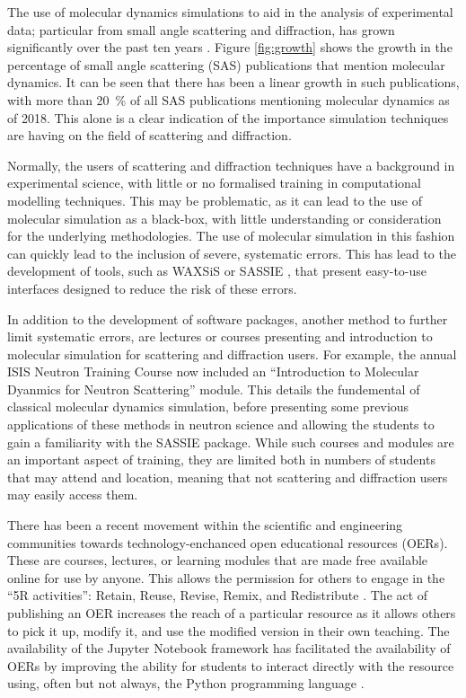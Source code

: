 \documentclass[pdf]{iucr}              %
\begin{document}
The use of molecular dynamics simulations to aid in the analysis of experimental data; particular from small angle scattering and diffraction, has grown significantly over the past ten years \cite{Pan2012,Boldon2015,Hub2018,Ivanovic2018,East2016,Wall2014,Wall2018,Satoh2015}.
Figure \ref{fig:growth} shows the growth in the percentage of small angle scattering (SAS) publications that mention molecular dynamics.
It can be seen that there has been a linear growth in such publications, with more than \SI{20}{\percent} of all SAS publications mentioning molecular dynamics as of 2018.
This alone is a clear indication of the importance simulation techniques are having on the field of scattering and diffraction.

Normally, the users of scattering and diffraction techniques have a background in experimental science, with little or no formalised training in computational modelling techniques.
This may be problematic, as it can lead to the use of molecular simulation as a black-box, with little understanding or consideration for the underlying methodologies.
The use of molecular simulation in this fashion can quickly lead to the inclusion of severe, systematic errors.
This has lead to the development of tools, such as WAXSiS or SASSIE \cite{Chen2014,Knight2015,Perkins2016}, that present easy-to-use interfaces designed to reduce the risk of these errors.

In addition to the development of software packages, another method to further limit systematic errors, are lectures or courses presenting and introduction to molecular simulation for scattering and diffraction users.
For example, the annual ISIS Neutron Training Course now included an ``Introduction to Molecular Dyanmics for Neutron Scattering'' module.
This details the fundemental of classical molecular dynamics simulation, before presenting some previous applications of these methods in neutron science and allowing the students to gain a familiarity with the SASSIE package.
While such courses and modules are an important aspect of training, they are limited both in numbers of students that may attend and location, meaning that not scattering and diffraction users may easily access them.

There has been a recent movement within the scientific and engineering communities towards technology-enchanced open educational resources (OERs).
These are courses, lectures, or learning modules that are made free available online for use by anyone.
This allows the permission for others to engage in the ``5R activities'': Retain, Reuse, Revise, Remix, and Redistribute \cite{opencontent2018}.
The act of publishing an OER increases the reach of a particular resource as it allows others to pick it up, modify it, and use the modified version in their own teaching.
The availability of the Jupyter Notebook framework \cite{Kluyver2016} has facilitated the availability of OERs by improving the ability for students to interact directly with the resource using, often but not always, the Python programming language \cite{Barba2017}.
\end{document}
